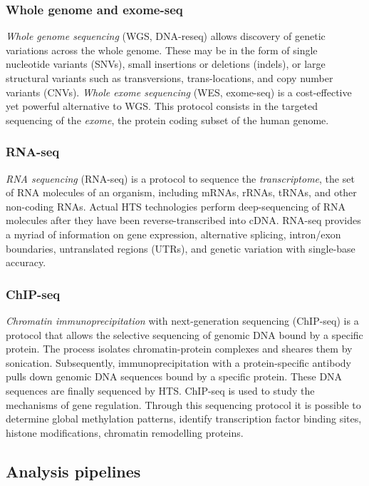 \subsubsection{Whole genome and exome-seq}

\emph{Whole genome sequencing} (WGS, DNA-reseq) allows discovery of genetic variations across the whole genome.
These may be in the form of single nucleotide variants (SNVs), small insertions or deletions (indels), or large structural variants such as transversions, trans-locations, and copy number variants (CNVs).
\emph{Whole exome sequencing} (WES, exome-seq) is a cost-effective yet powerful alternative to WGS.
This protocol consists in the targeted sequencing of the \emph{exome}, \ie the protein coding subset of the human genome.

\subsubsection{RNA-seq}
\emph{RNA sequencing} (RNA-seq) is a protocol to sequence the \emph{transcriptome}, \ie the set of RNA molecules of an organism, including mRNAs, rRNAs, tRNAs, and other non-coding RNAs.
Actual HTS technologies perform deep-sequencing of RNA molecules after they have been reverse-transcribed into cDNA.
RNA-seq provides a myriad of information on gene expression, alternative splicing, intron/exon boundaries, untranslated regions (UTRs), and genetic variation with single-base accuracy.

\subsubsection{ChIP-seq}
\emph{Chromatin immunoprecipitation} with next-generation sequencing (ChIP-seq) is a protocol that allows the selective sequencing of genomic DNA bound by a specific protein.
The process isolates chromatin-protein complexes and sheares them by sonication.
Subsequently, immunoprecipitation with a protein-specific antibody pulls down genomic DNA sequences bound by a specific protein.
These DNA sequences are finally sequenced by HTS.
ChIP-seq is used to study the mechanisms of gene regulation.
Through this sequencing protocol it is possible to determine global methylation patterns, identify transcription factor binding sites, histone modifications, chromatin remodelling proteins.

\subsection{Analysis pipelines}


